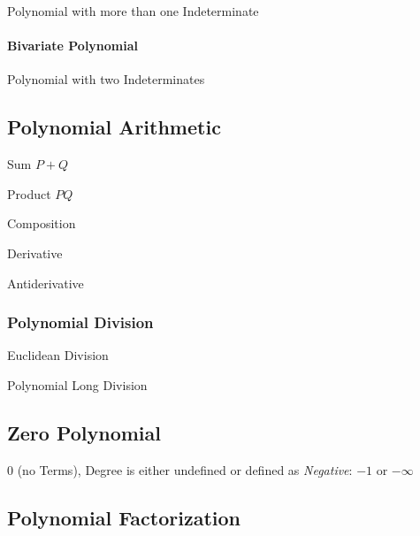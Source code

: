 Polynomial with more than one Indeterminate



\paragraph{Bivariate Polynomial}\label{sec:bivariate_polynomial}\hfill

Polynomial with two Indeterminates



\subsection{Polynomial Arithmetic}\label{sec:polynomial_arithmetic}

Sum $P + Q$

Product $P Q$

Composition

Derivative

Antiderivative



\subsubsection{Polynomial Division}\label{sec:polynomial_division}

Euclidean Division

Polynomial Long Division



\subsection{Zero Polynomial}\label{sec:zero_polynomial}

$0$ (no Terms), Degree is either undefined or defined as \emph{Negative}: $-1$
or $-\infty$



\subsection{Polynomial Factorization}\label{sec:polynomial_factorization}


